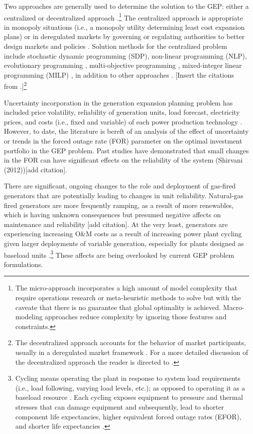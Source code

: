 \documentclass[10pt]{amsart}
\begin{document}
Two approaches are generally used to determine the solution to the GEP: either a centralized or decentralized approach \parencite{bakirtzis:2012aa}.\footnote{The micro-approach incorporates a high amount of model complexity that require operations research or meta-heuristic methods to solve but with the caveate that there is no guarantee that global optimality is achieved. Macro-modeling approaches reduce complexity by ignoring those features and constraints.} 
The centralized approach is appropriate in monopoly situations (i.e., a monopoly utility determining least cost expansion plans) or in deregulated markets by governing or regulating authorities to better design markets and policies \parencite{bakirtzis:2012aa}.
Solution methods for the centralized problem include stochastic dynamic programming (SDP)\parencite{}, non-linear programming (NLP)\parencite{}, evolutionary programming \parencite{}, multi-objective programming \parencite{}, mixed-integer linear programming (MILP) \parencite{}, in addition to other approaches \parencite{}\parencite{bakirtzis:2012aa}.  
[Insert the citations from \cite{bakirtzis:2012aa}.]\footnote{The decentralized approach accounts for the behavior of market participants, usually in a deregulated market framework \parencite{bakirtzis:2012aa}. 
For a more detailed discussion of the decentralized approach the reader is directed to \cite{bakirtzis:2012aa}.} 

Uncertainty incorporation in the generation expansion planning problem has included price volatility, reliability of generation units, load forecast, electricity prices, and costs (i.e., fixed and variable) of each power production technology \cite{hemmati:2013ab, pereira2010decision, pereira2011generation}. 
However, to date, the literature is bereft of an analysis of the effect of uncertainty or trends in the forced outage rate (FOR) parameter on the optimal investment portfolio in the GEP problem. 
Past studies have demonstrated that small changes in the FOR can have significant effects on the reliability of the system \parencite{} (Shirvani (2012))[add citation]. 

There are significant, ongoing changes to the role and deployment of gas-fired generators that are potentially leading to changes in unit reliability. 
Natural-gas fired generators are more frequently ramping, as a result of more renewables, which is having unknown consequences but presumed negative affects on maintenance and reliability [add citation].
At the very least, generators are experiencing increasing O\&M costs as a result of increasing power plant cycling given larger deployments of variable generation, especially for plants designed as baseload units \parencite{nrel:2012aa}.\footnote{Cycling means operating the plant in response to system load requirements (i.e., load following, varying load levels, etc.); as opposed to operating it as a baseload resource \parencite{nerc:2012aa}. Each cycling exposes equipment to pressure and thermal stresses that can damage equipment and subsequently, lead to shorter component life expectancies, higher equivalent forced outage rates (EFOR), and shorter life expectancies \parencite{nerc:2012aa}.} 
These affects are being overlooked by current GEP problem formulations.
\end{document}
